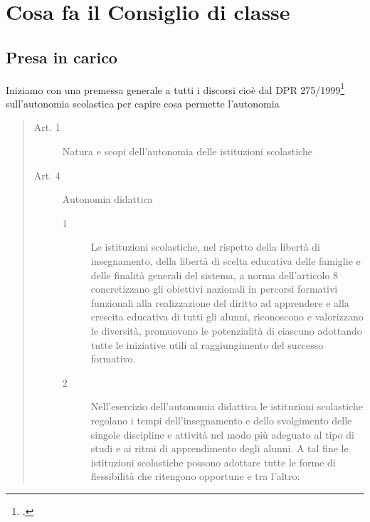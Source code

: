 \chapter{Cosa fa il Consiglio di classe}
\label{sec:Cosafaconsclass}
\section{Presa in carico}
\label{sub:presaincarico}
Iniziamo con una premessa generale a tutti i discorsi cioè dal DPR 275/1999\footcite{DPR_275_1999} sull'autonomia scolastica per capire cosa permette l'autonomia
\begin{quote}
\begin{description}
	\item[Art. 1] Natura e scopi dell'autonomia delle istituzioni scolastiche
	\item[Art. 4] Autonomia didattica
	\begin{description}
		\item[1] Le istituzioni scolastiche, nel rispetto della libertà di insegnamento, della libertà di scelta educativa delle famiglie e delle finalità generali del sistema, a norma dell'articolo 8 concretizzano gli obiettivi nazionali in percorsi formativi funzionali alla realizzazione del diritto ad apprendere e alla crescita educativa di tutti gli alunni, riconoscono e valorizzano le diversità, promuovono le potenzialità di ciascuno adottando tutte le iniziative utili al raggiungimento del successo formativo.
		\item [2] Nell'esercizio dell'autonomia didattica le istituzioni scolastiche regolano i tempi dell'insegnamento e dello svolgimento delle singole discipline e attività nel modo più adeguato al tipo di studi e ai ritmi di apprendimento degli alunni. A tal fine le istituzioni scolastiche possono adottare tutte le forme di flessibilità che ritengono opportune e tra l'altro:

\end{description}
\end{description}
\end{quote}
